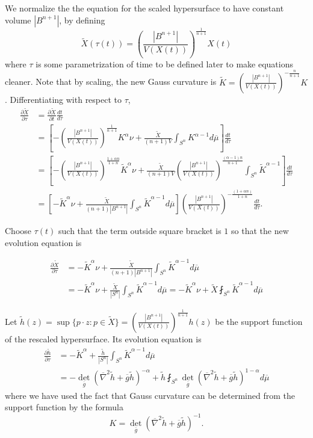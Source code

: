 \documentclass[12pt,a4paper]{article}
\begin{document}
We normalize the the equation for the scaled hypersurface to have constant volume $ |B^{n+1}| $, by defining 
\[ \tilde{X}(\tau(t)) = \left( \frac{|B^{n+1}|}{V(X(t))} \right)^{\frac{1}{n+1}}X(t) \]
where $ \tau $ is some parametrization of time to be defined later to make equations cleaner. Note that by scaling, the new Gauss curvature is $ \tilde{K} = \left(  \frac{|B^{n+1}|}{V(X(t))} \right)^{ -\frac{n}{n+1}}K $. Differentiating with respect to $ \tau $,
\begin{align*}
    \frac{\partial \tilde{X}}{\partial \tau} & = \frac{\partial \tilde{X}}{\partial t} \frac{d t}{d \tau} \\
    & = \left[-\left( \frac{|B^{n+1}|}{V(X(t))} \right)^{\frac{1}{n+1}}K^{\alpha}\nu+ \frac{\tilde{X}}{(n+1)V}\int_{S^{n}}K^{\alpha-1}d \overline{\mu}\right]\frac{d t}{d \tau} \\
    & = \left[-\left( \frac{|B^{n+1}|}{V(X(t))} \right)^{ \frac{1+\alpha n}{1+n}} \tilde{K}^{\alpha}\nu+ \frac{\tilde{X}}{(n+1)V}\left(  \frac{|B^{n+1}|}{V(X(t))} \right)^{ \frac{(\alpha-1)n}{n+1}}\int_{S^{n}}\tilde{K}^{\alpha -1}\right]\frac{d t}{d \tau}\\
    & = \left[-\tilde{K}^{\alpha}\nu + \frac{\tilde{X}}{(n+1)|B^{n+1}|}\int_{S^{n}}\tilde{K}^{\alpha-1} d \overline{\mu}\right]\left( \frac{|B^{n+1}|}{V(X(t))} \right)^{ -\frac{(1+\alpha n)}{1+n}} \frac{dt}{d \tau}. 
\end{align*}

Choose $ \tau(t) $ such that the term outside square bracket is $ 1 $ so that the new evolution equation is 

\begin{align*}
    \frac{\partial \tilde{X}}{\partial \tau} & = -\tilde{K}^{\alpha}\nu + \frac{\tilde{X}}{(n+1)|B^{n+1}|}\int_{S^{n}}\tilde{K}^{\alpha-1} d \overline{\mu} \\ 
    & =-\tilde{K}^{\alpha}\nu + \frac{\tilde{X}}{|S^{n}|}\int_{S^{n}}\tilde{K}^{\alpha-1} d \overline{\mu} =-\tilde{K}^{\alpha}\nu + \tilde{X}\fint_{S^{n}}\tilde{K}^{\alpha-1} d \overline{\mu}
\end{align*}

Let $ \tilde{h}(z) = \sup \{p \cdot z : p \in \tilde{X} \} = \left( \frac{|B^{n+1}|}{V(X(t))} \right)^{\frac{1}{n+1}} h(z) $ be the support function of the rescaled hypersurface. Its evolution equation is
\begin{align*}
    \frac{\partial \tilde{h}}{\partial \tau} &= - \tilde{K}^{\alpha} + \frac{\tilde{h}}{|S^{n}|}\int_{S^{n}}\tilde{K}^{\alpha-1} d \overline{\mu} \\
    & = - \det_{\overline{g}}(\overline{\nabla}^{2}\tilde{h}+\overline{g}\tilde{h})^{-\alpha} + \tilde{h}\fint_{S^{n}}\det_{\overline{g}}(\overline{\nabla}^{2}\tilde{h}+\overline{g}\tilde{h})^{1-\alpha} d \overline{\mu}
\end{align*}
where we have used the fact that Gauss curvature can be determined from the support function by the formula 
\[ K = \det_{\overline{g}}(\overline{\nabla}^{2}\tilde{h}+\overline{g}\tilde{h})^{-1} .\]
\end{document}
